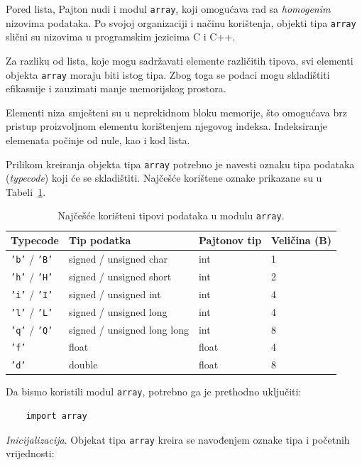 Pored lista, Pajton nudi i modul \texttt{array}, koji omogućava rad sa \textit{homogenim} nizovima podataka. Po svojoj organizaciji i načinu korištenja, objekti tipa \texttt{array} slični su nizovima u programskim jezicima {C} i {C++}.

Za razliku od lista, koje mogu sadržavati elemente različitih tipova, svi elementi objekta \texttt{array} moraju biti istog tipa. Zbog toga se podaci mogu skladištiti efikasnije i zauzimati manje memorijskog prostora.

Elementi niza smješteni su u neprekidnom bloku memorije, što omogućava brz pristup proizvoljnom elementu korištenjem njegovog indeksa. Indeksiranje elemenata počinje od nule, kao i kod lista.

Prilikom kreiranja objekta tipa \texttt{array} potrebno je navesti oznaku tipa podataka (\textit{typecode}) koji će se skladištiti. Najčešće korištene oznake prikazane su u Tabeli~\ref{tab:TipPodatakaArray}.

\begin{table}[H]
	\caption{Najčešće korišteni tipovi podataka u modulu \texttt{array}.}
	\label{tab:TipPodatakaArray}
	\centering
	\begin{tabular}{llll}
		\hline
		\textbf{Typecode} & \textbf{Tip podatka} & \textbf{Pajtonov tip} & \textbf{Veličina (B)} \\
		\hline
		\texttt{'b'} / \texttt{'B'} & signed / unsigned char & int & 1 \\
		\texttt{'h'} / \texttt{'H'} & signed / unsigned short & int & 2 \\
		\texttt{'i'} / \texttt{'I'} & signed / unsigned int & int & 4 \\
		\texttt{'l'} / \texttt{'L'} & signed / unsigned long & int & 4 \\
		\texttt{'q'} / \texttt{'Q'} & signed / unsigned long long & int & 8 \\
		\texttt{'f'} & float & float & 4 \\
		\texttt{'d'} & double & float & 8 \\
		\hline
	\end{tabular}
\end{table}

Da bismo koristili modul \texttt{array}, potrebno ga je prethodno uključiti:

\begin{verbatim}
	import array
\end{verbatim}

\textit{Inicijalizacija}. Objekat tipa \texttt{array} kreira se navođenjem oznake tipa i početnih vrijednosti:


